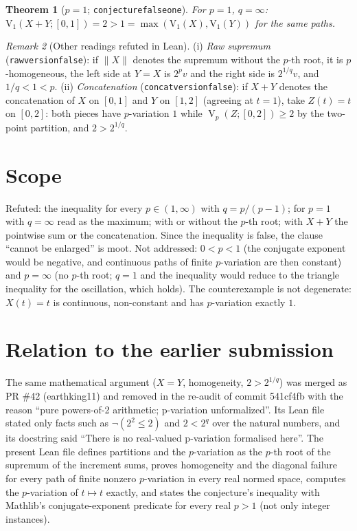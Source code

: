 \documentclass[11pt]{article}
\renewcommand{\_}{\oldus\allowbreak}
\newtheorem{theorem}{Theorem}
\theoremstyle{definition}
\theoremstyle{remark}
\newtheorem{remark}[theorem]{Remark}
\newcommand{\V}{\operatorname{V}_p}
\begin{document}
\begin{theorem}[$p=1$; \texttt{conjecture\_00000004007\_false\_one}]
For $p=1$, $q=\infty$: $\mathrm{V}_1(X+Y;[0,1])=2>1=\max(\mathrm{V}_1(X),\mathrm{V}_1(Y))$ for the
same paths.
\end{theorem}

\begin{remark}[Other readings refuted in Lean]
(i) \emph{Raw supremum} (\texttt{raw\_version\_false}): if $\|X\|$ denotes the supremum without the
$p$-th root, it is $p$-homogeneous, the left side at $Y=X$ is $2^p v$ and the right side is
$2^{1/q}v$, and $1/q<1<p$.
(ii) \emph{Concatenation} (\texttt{concat\_version\_false}): if $X+Y$ denotes the concatenation of
$X$ on $[0,1]$ and $Y$ on $[1,2]$ (agreeing at $t=1$), take $Z(t)=t$ on $[0,2]$: both pieces have
$p$-variation $1$ while $\V(Z;[0,2])\ge 2$ by the two-point partition, and $2>2^{1/q}$.
\end{remark}

\section{Scope}

Refuted: the inequality for every $p\in(1,\infty)$ with $q=p/(p-1)$; for $p=1$ with $q=\infty$ read
as the maximum; with or without the $p$-th root; with $X+Y$ the pointwise sum or the concatenation.
Since the inequality is false, the clause ``cannot be enlarged'' is moot. Not addressed:
$0<p<1$ (the conjugate exponent would be negative, and continuous paths of finite $p$-variation are
then constant) and $p=\infty$ (no $p$-th root; $q=1$ and the inequality would reduce to the
triangle inequality for the oscillation, which holds). The counterexample is not degenerate:
$X(t)=t$ is continuous, non-constant and has $p$-variation exactly $1$.

\section{Relation to the earlier submission}

The same mathematical argument ($X=Y$, homogeneity, $2>2^{1/q}$) was merged as PR \#42
(earthking11) and removed in the re-audit of commit 541cf4fb with the reason ``pure powers-of-2
arithmetic; p-variation unformalized''. Its Lean file stated only facts such as
$\neg(2^2\le 2)$ and $2<2^q$ over the natural numbers, and its docstring said ``There is no
real-valued p-variation formalised here''. The present Lean file defines partitions and the
$p$-variation as the $p$-th root of the supremum of the increment sums, proves homogeneity and the
diagonal failure for every path of finite nonzero $p$-variation in every real normed space,
computes the $p$-variation of $t\mapsto t$ exactly, and states the conjecture's inequality with
Mathlib's conjugate-exponent predicate for every real $p>1$ (not only integer instances).
\end{document}
